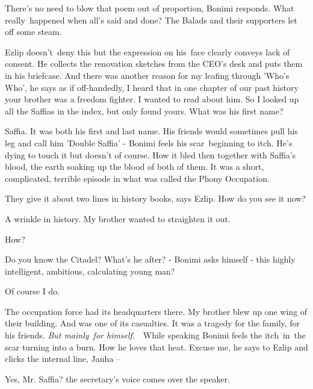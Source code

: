 \documentclass[twoside,11pt]{book}
\begin{document}
{\textquotedbl}There's no need to blow that poem out of proportion,{\textquotedbl} Bonimi responds. {\textquotedbl}What
really~happened when all's said and done? The Balads and their supporters let off some steam.{\textquotedbl} 

Ezlip doesn't~deny this but the expression on his~face clearly conveys lack of consent. He collects the renovation
sketches from the CEO's desk and puts them in his briefcase. {\textquotedbl}And there was another reason for my leafing
through {}'Who's Who{}',{\textquotedbl} he says as if off-handedly, {\textquotedbl}I heard that in one chapter of our
past history your brother was a freedom fighter. I wanted to read about him. So I looked up all the Saffias in the
index, but only found yours. What was his first name?{\textquotedbl}~

{\textquotedbl}Saffia. It was both his first and last name. His friends would sometimes pull his leg and call him
'Double Saffia' -{\textquotedbl} Bonimi feels his scar~beginning to itch. He's dying to touch it but doesn't of course.
How it bled then together with Saffia's blood, the earth soaking up the blood of both of them. {\textquotedbl}It was a
short, complicated, terrible episode in what was called the Phony Occupation.{\textquotedbl}

{\textquotedbl}They give it about two lines in history books,{\textquotedbl} says Ezlip. {\textquotedbl}How do you see
it now?{\textquotedbl} 

{\textquotedbl}A wrinkle in history. My brother wanted to straighten it out.{\textquotedbl} 

{\textquotedbl}How?{\textquotedbl} 

{\textquotedbl}Do you know the Citadel?{\textquotedbl} What's he after? - Bonimi asks himself - this highly intelligent,
ambitious, calculating young man? 

{\textquotedbl}Of course I do.{\textquotedbl} 

{\textquotedbl}The occupation force had its headquarters there. My brother blew up one wing of their building. And was
one of its casualties. It was a tragedy for the family, for his friends. \textit{But mainly}\ \textit{for
himself}.{\textquotedbl}\ \ While speaking Bonimi feels the itch\ in\ the scar turning into a burn. How he loves that
heat. {\textquotedbl}Excuse me,{\textquotedbl} he says to Ezlip and clicks the internal line, {\textquotedbl}Janha --
{\textquotedbl}

{\textquotedbl}Yes, Mr. Saffia?{\textquotedbl} the secretary's voice comes over the speaker.
\end{document}
